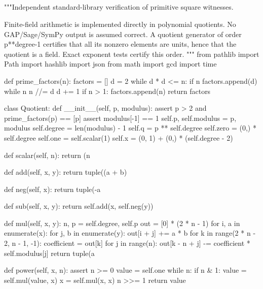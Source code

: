 \documentclass[11pt,a4paper]{article}
\begin{document}
\subsection*{\texorpdfstring{}{verify square witnesses.py}}
\begin{CompleteProgram}
"""Independent standard-library verification of primitive square witnesses.

Finite-field arithmetic is implemented directly in polynomial quotients.
No GAP/Sage/SymPy output is assumed correct. A quotient generator of order
p**degree-1 certifies that all its nonzero elements are units, hence that
the quotient is a field. Exact exponent tests certify this order.
"""
from pathlib import Path
import hashlib
import json
from math import gcd
import time


def prime_factors(n):
    factors = []
    d = 2
    while d * d <= n:
        if n %
            factors.append(d)
            while n %
                n //= d
        d += 1
    if n > 1:
        factors.append(n)
    return factors


class Quotient:
    def __init__(self, p, modulus):
        assert p > 2 and prime_factors(p) == [p]
        assert modulus[-1] == 1
        self.p, self.modulus = p, modulus
        self.degree = len(modulus) - 1
        self.q = p ** self.degree
        self.zero = (0,) * self.degree
        self.one = self.scalar(1)
        self.x = (0, 1) + (0,) * (self.degree - 2)

    def scalar(self, n):
        return (n %

    def add(self, x, y):
        return tuple((a + b) %

    def neg(self, x):
        return tuple(-a %

    def sub(self, x, y):
        return self.add(x, self.neg(y))

    def mul(self, x, y):
        n, p = self.degree, self.p
        out = [0] * (2 * n - 1)
        for i, a in enumerate(x):
            for j, b in enumerate(y):
                out[i + j] += a * b
        for k in range(2 * n - 2, n - 1, -1):
            coefficient = out[k] %
            for j in range(n):
                out[k - n + j] -= coefficient * self.modulus[j]
        return tuple(a %

    def power(self, x, n):
        assert n >= 0
        value = self.one
        while n:
            if n & 1:
                value = self.mul(value, x)
            x = self.mul(x, x)
            n >>= 1
        return value


\end{CompleteProgram}
\end{document}

